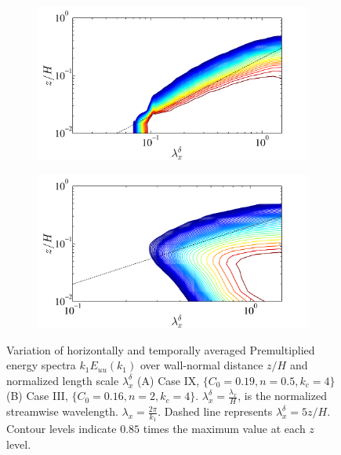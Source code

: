 \begin{figure}
\centering
        \begin{subfigure}[t]{0.5\textwidth}
                \includegraphics[width=\linewidth]{Fig2/energy_n05_logscale_85.pdf}
                \caption{}
                \label{fig:energy_n05}
        \end{subfigure}%
        \centering
        \begin{subfigure}[t]{0.5\textwidth}
                \includegraphics[width=\linewidth]{Fig2/energy_n2_logscale_85.pdf}
                \label{fig:energy_n2}
        \end{subfigure}%
        \caption[Log variation of Energy]{Variation of horizontally and temporally averaged Premultiplied energy spectra $k_1E_{uu}(k_1)$ over wall-normal distance $z/H$ and normalized length scale $\lambda^{\delta}_{x}$ (A) Case IX, $\lbrace C_0 = 0.19,n = 0.5, k_c = 4\rbrace $ (B) Case III, $\lbrace C_0 = 0.16,n = 2, k_c = 4\rbrace $. $\lambda^{\delta}_{x} = \frac{\lambda_x}{H}$, is the normalized streamwise wavelength. $\lambda_x = \frac{2\pi}{k_1}$. Dashed line represents $\lambda_x^{\delta} = 5z/H$. Contour levels indicate $0.85$ times the maximum value at each $z$ level.}\label{fig:2d_spec}
\end{figure}

